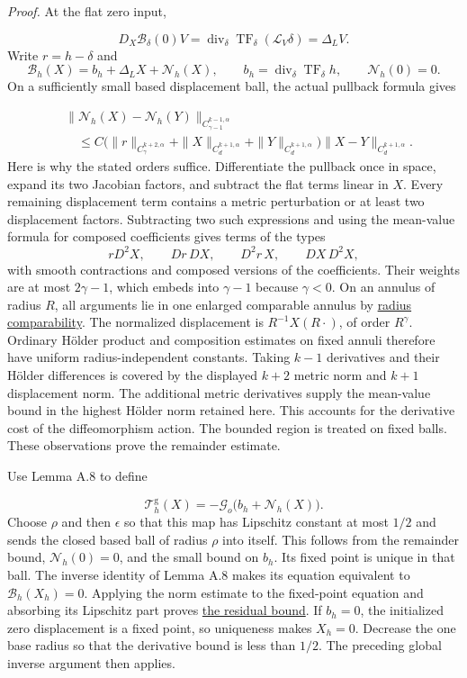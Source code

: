 \documentclass[
  english,
  11pt,
  reqno]{amsart}
\begin{document}
\emph{Proof.} At the flat zero input,

\label{eq:online-gauge-flat-linearization} \[
D_X\mathcal B_\delta(0)V
=\operatorname{div}_\delta\operatorname{TF}_\delta
 (\mathcal L_V\delta)
=\Delta_LV.
\] Write \(r=h-\delta\) and \[
\mathcal B_h(X)=b_h+\Delta_LX+\mathcal N_h(X),
\qquad
b_h=\operatorname{div}_\delta\operatorname{TF}_\delta h,
\qquad \mathcal N_h(0)=0.
\] On a sufficiently small based displacement ball, the actual pullback
formula gives

\label{eq:online-gauge-remainder-estimate} \[
\begin{aligned}
&\|\mathcal N_h(X)-\mathcal N_h(Y)\|_{C^{k-1,\alpha}_{\gamma-1}}
\\[-.3ex]&\quad\le C\bigl(\|r\|_{C^{k+2,\alpha}_\gamma}
+\|X\|_{C^{k+1,\alpha}_d}
+\|Y\|_{C^{k+1,\alpha}_d}\bigr)
\|X-Y\|_{C^{k+1,\alpha}_d}.
\end{aligned}
\] Here is why the stated orders suffice. Differentiate the pullback
once in space, expand its two Jacobian factors, and subtract the flat
terms linear in \(X\). Every remaining displacement term contains a
metric perturbation or at least two displacement factors. Subtracting
two such expressions and using the mean-value formula for composed
coefficients gives terms of the types \[
rD^2X,\qquad Dr\,DX,\qquad D^2r\,X,
\qquad DX\,D^2X,
\] with smooth contractions and composed versions of the coefficients.
Their weights are at most \(2\gamma-1\), which embeds into \(\gamma-1\)
because \(\gamma<0\). On an annulus of radius \(R\), all arguments lie
in one enlarged comparable annulus by
\hyperref[eq:online-gauge-radius-comparability]{radius comparability}.
The normalized displacement is \(R^{-1}X(R\cdot)\), of order
\(R^\gamma\). Ordinary Hölder product and composition estimates on fixed
annuli therefore have uniform radius-independent constants. Taking
\(k-1\) derivatives and their Hölder differences is covered by the
displayed \(k+2\) metric norm and \(k+1\) displacement norm. The
additional metric derivatives supply the mean-value bound in the highest
Hölder norm retained here. This accounts for the derivative cost of the
diffeomorphism action. The bounded region is treated on fixed balls.
These observations prove the remainder estimate.

Use Lemma A.8 to define

\label{eq:online-gauge-initialized-iteration} \[
\mathcal T_h^{\mathrm g}(X)
=-\mathcal G_o\bigl(b_h+\mathcal N_h(X)\bigr).
\] Choose \(\rho\) and then \(\epsilon\) so that this map has Lipschitz
constant at most \(1/2\) and sends the closed based ball of radius
\(\rho\) into itself. This follows from the remainder bound,
\(\mathcal N_h(0)=0\), and the small bound on \(b_h\). Its fixed point
is unique in that ball. The inverse identity of Lemma A.8 makes its
equation equivalent to \(\mathcal B_h(X_h)=0\). Applying the norm
estimate to the fixed-point equation and absorbing its Lipschitz part
proves \hyperref[eq:online-gauge-residual-displacement-bound]{the
residual bound}. If \(b_h=0\), the initialized zero displacement is a
fixed point, so uniqueness makes \(X_h=0\). Decrease the one base radius
so that the derivative bound is less than \(1/2\). The preceding global
inverse argument then applies.
\end{document}
